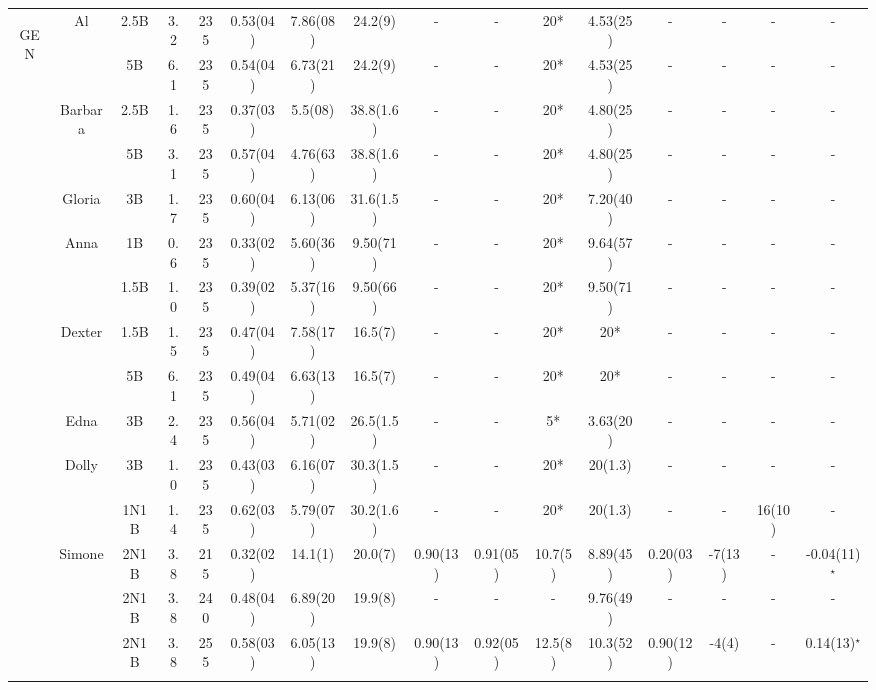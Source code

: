 \documentclass[pdftex,letterpaper,12pt]{report}
\begin{document}
\begin{table}
\begin{center}
\begin{tabular}{|c|c|ccc|ccc|ccccc|cc|c|}
			\hline
			\hline
			\multirow{20}{*}{\begin{sideways}GEN\end{sideways}} & \multirow{2}{*}{Al} & 2.5B & 3.2 & 235 & 0.53(04) & 7.86(08) & 24.2(9) & - & - & 20* & 4.53(25) & - & - & - & - \\
			& & 5B & 6.1 & 235 & 0.54(04) & 6.73(21) & 24.2(9) & - & - & 20* & 4.53(25) & - & - & - & - \\
			\cline{2-16}
			& \multirow{2}{*}{Barbara} & 2.5B & 1.6 & 235 & 0.37(03) & 5.5(08) & 38.8(1.6) & - & - & 20* & 4.80(25) & - & - & - & - \\
			& & 5B & 3.1 & 235 & 0.57(04) & 4.76(63) & 38.8(1.6) & - & - & 20* & 4.80(25) & - & - & - & - \\
			\cline{2-16}
			& Gloria & 3B & 1.7 & 235 & 0.60(04) & 6.13(06) & 31.6(1.5) & - & - & 20* & 7.20(40) & - & - & - & - \\
			\cline{2-16}
			& \multirow{2}{*}{Anna} & 1B & 0.6 & 235 & 0.33(02) & 5.60(36) & 9.50(71) & - & - & 20* & 9.64(57) & - & - & - & - \\
			& & 1.5B & 1.0 & 235 & 0.39(02) & 5.37(16) & 9.50(66) & - & - & 20* & 9.50(71) & - & - & - & - \\
			\cline{2-16}
			& \multirow{2}{*}{Dexter} & 1.5B & 1.5 & 235 & 0.47(04) & 7.58(17) & 16.5(7) & - & - & 20* & 20* & - & - & - & - \\
			& & 5B & 6.1 & 235 & 0.49(04) & 6.63(13) & 16.5(7) & - & - & 20* & 20* & - & - & - & - \\
			\cline{2-16}
			& Edna & 3B & 2.4 & 235 & 0.56(04) & 5.71(02) & 26.5(1.5) & - & - & 5* & 3.63(20) & - & - & - & - \\
			\cline{2-16}
			& \multirow{2}{*}{Dolly} & 3B & 1.0 & 235 & 0.43(03) & 6.16(07) & 30.3(1.5) & - & - & 20* & 20(1.3) & - & - & - & - \\
			& & 1N1B & 1.4 & 235 & 0.62(03) & 5.79(07) & 30.2(1.6) & - & - & 20* & 20(1.3) & - & - & 16(10) & - \\
			\cline{2-16}
			& \multirow{3}{*}{Simone} & 2N1B & 3.8 & 215 & 0.32(02) & 14.1(1) & 20.0(7) & 0.90(13)  & 0.91(05) & 10.7(5) & 8.89(45) & 0.20(03) & -7(13) & - & -0.04(11)$^\star$ \\
			& & 2N1B & 3.8 & 240 & 0.48(04) & 6.89(20) & 19.9(8) & - & - & - & 9.76(49) & - & - & - & - \\
			& & 2N1B & 3.8 & 255 & 0.58(03) & 6.05(13) & 19.9(8) & 0.90(13) & 0.92(05) & 12.5(8) & 10.3(52) & 0.90(12) & -4(4) & - & 0.14(13)$^\star$ \\
			\cline{2-16}

\end{tabular}
\end{center}
\end{table}
\end{document}
